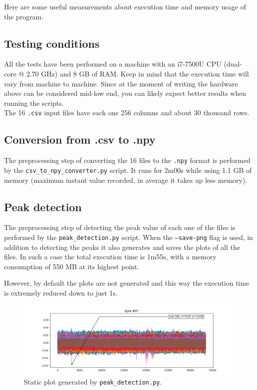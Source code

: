 \documentclass[11pt,a4paper]{article}
\begin{document}
Here are some useful measurements about execution time and memory usage of the program.

\subsection{Testing conditions}

All the tests have been performed on a machine with an i7-7500U CPU (dual-core @ 2.70 GHz) and 8 GB of RAM.
Keep in mind that the execution time will vary from machine to machine.
Since at the moment of writing the hardware above can be considered mid-low end, you can likely expect better results when running the scripts.\\

The 16 \texttt{.csv} input files have each one 256 columns and about 30 thousand rows.

\subsection{Conversion from .csv to .npy}

The preprocessing step of converting the 16 files to the \texttt{.npy} format is performed by the \texttt{csv\_to\_npy\_converter.py} script.
It runs for 2m00s while using 1.1 GB of memory (maximum instant value recorded, in average it takes up less memory).

\subsection{Peak detection}

The preprocessing step of detecting the peak value of each one of the files is performed by the \texttt{peak\_detection.py} script.
When the \texttt{--save-png} flag is used, in addition to detecting the peaks it also generates and saves the plots of all the files.
In such a case the total execution time is 1m55s, with a memory consumption of 550 MB at its highest point.

However, by default the plots are not generated and this way the execution time is extremely reduced down to just 1s.

\begin{figure}[H]
    \centering
    \includegraphics[scale=0.55]{static_plot.png}
    \caption{Static plot generated by \texttt{peak\_detection.py}.}
    \label{fig:static_plot}
\end{figure}
\end{document}
